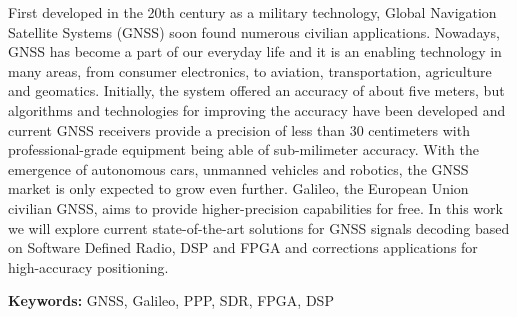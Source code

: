 
First developed in the 20th century as a military technology, Global Navigation Satellite Systems (GNSS) soon found numerous civilian applications. Nowadays, GNSS has become a part of our everyday life and it is an enabling technology in many areas, from consumer electronics, to aviation, transportation, agriculture and geomatics. Initially, the system offered an accuracy of about five meters, but algorithms and technologies for improving the accuracy have been developed and current GNSS receivers provide a precision of less than 30 centimeters with professional-grade equipment being able of sub-milimeter accuracy. With the emergence of autonomous cars, unmanned vehicles and robotics, the GNSS market is only expected to grow even further. Galileo, the European Union civilian GNSS, aims to provide higher-precision capabilities for free. In this work we will explore current state-of-the-art solutions for GNSS signals decoding based on Software Defined Radio, DSP and FPGA and corrections applications for high-accuracy positioning.

\textbf{Keywords:} GNSS, Galileo, PPP, SDR, FPGA, DSP
